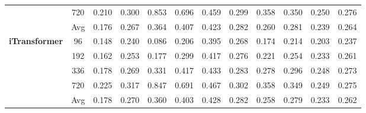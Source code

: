 \documentclass[twoside,12pt]{article}
\begin{document}
\begin{table}[htbp]
{\begin{small}
\begin{tabular}{c|c|cc|cc|cc|cc|cc}
                                                                 & 720        & 0.210                    & 0.300                         & 0.853                        & 0.696                        & 0.459                            & 0.299 & 0.358 & 0.350 & 0.250 & 0.276 \\
        \cmidrule(lr){2-12}
                                                                 & Avg        & 0.176                    & 0.267                         & 0.364                        & 0.407                        & 0.423                            & 0.282 & 0.260 & 0.281 & 0.239 & 0.264 \\
        \midrule
        \multirow{5}{*}{\textbf{iTransformer}}                   & 96         & 0.148                    & 0.240                         & 0.086                        & 0.206                        & 0.395                            & 0.268 & 0.174 & 0.214 & 0.203 & 0.237 \\
                                                                 & 192        & 0.162                    & 0.253                         & 0.177                        & 0.299                        & 0.417                            & 0.276 & 0.221 & 0.254 & 0.233 & 0.261 \\
                                                                 & 336        & 0.178                    & 0.269                         & 0.331                        & 0.417                        & 0.433                            & 0.283 & 0.278 & 0.296 & 0.248 & 0.273 \\
                                                                 & 720        & 0.225                    & 0.317                         & 0.847                        & 0.691                        & 0.467                            & 0.302 & 0.358 & 0.349 & 0.249 & 0.275 \\
        \cmidrule(lr){2-12}
                                                                 & Avg        & 0.178                    & 0.270                         & 0.360                        & 0.403                        & 0.428                            & 0.282 & 0.258 & 0.279 & 0.233 & 0.262 \\
        \bottomrule
      \end{tabular}
    \end{small}
  }
  \resizebox{0.9\textwidth}{!}
  {
    \begin{small}
      \renewcommand{\multirowsetup}{\centering}
      \setlength{\tabcolsep}{5.3pt}

\end{small}}
\end{table}
\end{document}
